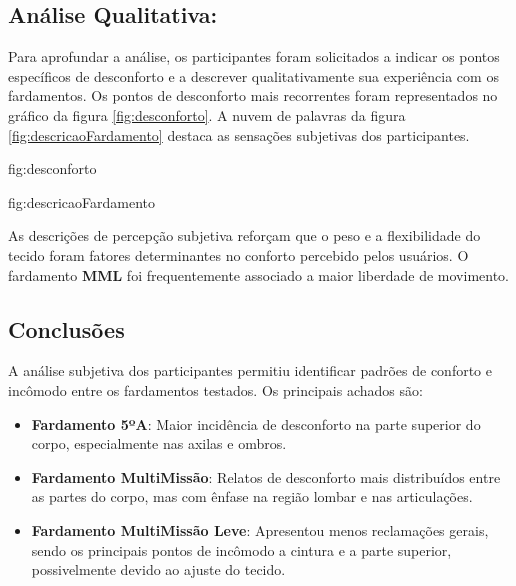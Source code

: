  
    \subsection{ Análise Qualitativa:}
        Para aprofundar a análise, os participantes foram solicitados a indicar os pontos específicos 
        de desconforto e a descrever qualitativamente sua experiência com os fardamentos. Os pontos 
        de desconforto mais recorrentes foram representados no gráfico da figura \ref{fig:desconforto}. 
        A nuvem de palavras da figura \ref{fig:descricaoFardamento} destaca as sensações subjetivas 
        dos participantes. 
        
        {fig:desconforto}

        {fig:descricaoFardamento}

        As descrições de percepção subjetiva reforçam que o peso e a flexibilidade do tecido foram 
        fatores determinantes no conforto percebido pelos usuários. O fardamento \textbf{\acrlong{MML}} foi 
        frequentemente associado a maior liberdade de movimento.
    \subsection{Conclusões}
    A análise subjetiva dos participantes permitiu identificar padrões de conforto e incômodo entre 
    os fardamentos testados. Os principais achados são:

    \begin{itemize}
        \item \textbf{Fardamento 5ºA}: Maior incidência de desconforto na parte superior do corpo, 
        especialmente nas axilas e ombros.
        \item \textbf{Fardamento MultiMissão}: Relatos de desconforto mais distribuídos entre as 
        partes do corpo, mas com ênfase na região lombar e nas articulações.
        \item \textbf{Fardamento MultiMissão Leve}: Apresentou menos reclamações gerais, sendo os 
        principais pontos de incômodo a cintura e a parte superior, possivelmente devido ao ajuste do tecido.
        \end{itemize}
